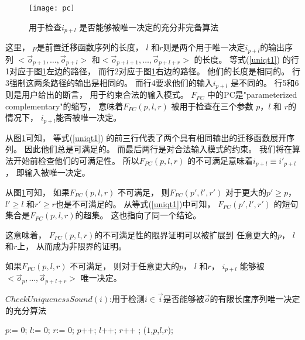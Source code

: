\begin{figure}[t]
\begin{center}
\texttt{[image: pc]}
\end{center}
\caption{用于检查$i_{p+l}$ 是否能够被唯一决定的充分非完备算法}
  \label{fig_pc_double}
\end{figure}


这里，
$p$是前置迁移函数序列的长度，
$l$ 和$r$则是两个用于唯一决定$i_{p+l}$的输出序列
$<\vec{o}_{p+1},\dots,\vec{o}_{p+l}>$ 和$<\vec{o}_{p+l+1},\dots,\vec{o}_{p+l+r}>$
的长度。
等式(\ref{uniqt1}) 的行1对应于图\ref{fig_pc_double}左边的路径，
而行2对应于图\ref{fig_pc_double}右边的路径。
他们的长度是相同的。
行3强制这两条路径的输出是相同的。
而行4要求他们的输入$i_{p+l}$ 是不同的。
行5和6则是用户给出的断言，
用于约束合法的输入模式。
$F_{PC}$ 中的PC是"parameterized complementary"的缩写，
意味着$F_{PC}(p,l,r)$ 被用于检查在三个参数 $p$，$l$ 和 $r$的情况下，
$i_{p+l}$能否被唯一决定。


从图\ref{fig_pc_double}可知，
等式(\ref{uniqt1}) 的前三行代表了两个具有相同输出的迁移函数展开序列。
因此他们总是可满足的。
而最后两行是对合法输入模式的约束。
我们将在算法开始前检查他们的可满足性。
所以$F_{PC}(p,l,r)$ 的不可满足意味着$i_{p+l}\equiv i'_{p+l}$，
即输入被唯一决定。

从图\ref{fig_pc_double}可知，
如果$F_{PC}(p,l,r)$ 不可满足，
则$F_{PC}(p',l',r')$ 对于更大的$p'\ge p$， $l'\ge l$ 和$r'\ge r$也是不可满足的。
从等式(\ref{uniqt1})中可知，
$F_{PC}(p',l',r')$ 的短句集合是$F_{PC}(p,l,r)$的超集。
这也指向了同一个结论。

这意味着，
$F_{PC}(p,l,r)$的不可满足性的限界证明可以被扩展到
任意更大的$p$， $l$ 和$r$上，
从而成为非限界的证明。

\begin{proposition}\label{prop_pc1}
如果$F_{PC}(p,l,r)$ 不可满足，
则对于任意更大的$p$， $l$ 和$r$，
$i_{p+l}$ 能够被$<\vec{o}_{p},\dots,\vec{o}_{p+l+r}>$ 唯一决定。
\end{proposition}

\begin{algorithm}[t]
\caption{$CheckUniquenessSound(i)$:用于检测$i\in\vec{i}$是否能够被$\vec{o}$的有限长度序列唯一决定的充分算法}
\label{alg_pcsound_chap1}
\begin{algorithmic}[1]
\STATE $p$:= 0;
\STATE $l$:= 0;
\STATE $r$:= 0;
\STATE $p$++;
\STATE $l$++;
\STATE $r$++ ;
\label{linepc1sound}
\RETURN ($1$,$p$,$l$,$r$)\label{lineln1sound};
\ENDIF
\ENDWHILE
\end{algorithmic}
\end{algorithm}

